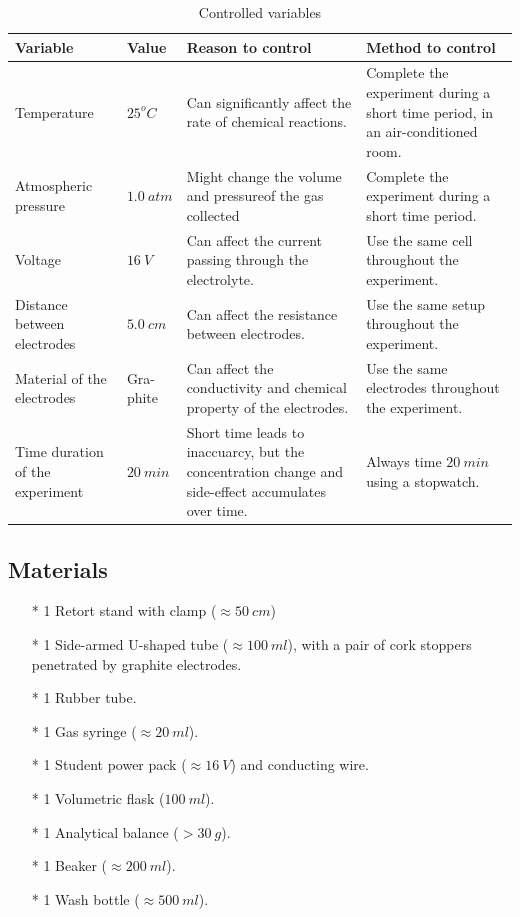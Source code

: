 \documentclass[a4paper]{article}
\begin{document}
\begin{table}
    \centering
    \caption{Controlled variables}
    \label{tab.control}
    \begin{tabularx}{1\textwidth}{p{2cm} p{0.8cm} X X}
        \hline
        Variable                    & Value                  & Reason to control                                          & Method to control                                    \\ \hline
        Temperature              & $25^oC$                & Can significantly affect the rate of chemical reactions. & Complete the experiment during a short time period, in an air-conditioned room. \\
        Atmospheric pressure        & $\SI{1.0 }{atm}$       & Might change the volume and pressureof the gas collected      & Complete the experiment during a short time period. \\
        Voltage                     & $\SI{16 }{V}$          & Can affect the current passing through the electrolyte.                             & Use the same cell throughout the experiment. \\
        Distance between electrodes & $\SI{5.0}{cm}$        & Can affect the resistance between electrodes. & Use the same setup throughout the experiment. \\
        Material of the electrodes  & \makecell{Gra-\\phite}           & Can affect the conductivity and chemical property of the electrodes. & Use the same electrodes throughout the experiment. \\ 
        Time duration of the experiment & $\SI{20}{min}$ & Short time leads to inaccuarcy, but the concentration change and side-effect accumulates over time. & Always time $\SI{20}{min}$ using a stopwatch.\\\hline
    \end{tabularx}
\end{table}

\subsection{Materials}

\begin{itemize}
    \item[*] 1 Retort stand with clamp ($\approx \SI{50}{cm}$)
    \item[*] 1 Side-armed U-shaped tube ($\approx \SI{100}{ml}$), with a pair of cork stoppers penetrated by graphite electrodes.
    \item[*] 1 Rubber tube.
    \item[*] 1 Gas syringe ($\approx \SI{20}{ml}$).
    \item[*] 1 Student power pack ($\approx \SI{16}{V}$) and conducting wire.
    \item[*] 1 Volumetric flask ($\SI{100}{ml}$).
    \item[*] 1 Analytical balance ($>\SI{30}{g}$).
    \item[*] 1 Beaker ($\approx \SI{200}{ml}$).
    \item[*] 1 Wash bottle ($\approx \SI{500}{ml}$).
\end{itemize}
\end{document}
